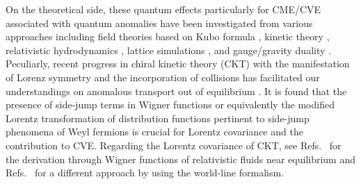 \documentclass[aps,prd,showkeys,preprint,amsmath,amssymb,nofootinbib]{revtex4-1}
\begin{document}
On the theoretical side, these quantum effects particularly for CME/CVE associated with quantum anomalies have been investigated from various approaches including field theories based on Kubo formula \cite{Fukushima:2008xe,Kharzeev:2009pj,Landsteiner:2011cp}, kinetic theory \cite{Gao:2012ix, Son:2012wh, Stephanov:2012ki, Son:2012zy,Chen:2012ca,Manuel:2013zaa,
Manuel:2014dza,Kharzeev:2016sut, Huang:2017tsq,Gao:2017gfq}, 
relativistic hydrodynamics \cite{Son:2009tf,Neiman:2010zi,Sadofyev:2010pr,Pu:2010as,Kharzeev:2011ds},
lattice simulations \cite{Abramczyk:2009gb,Buividovich:2009wi,Buividovich:2009zzb,Buividovich:2010tn,Yamamoto:2011gk,Mueller:2016ven,Mace:2016shq}, and
gauge/gravity duality \cite{Erdmenger2009,Torabian2009a,Banerjee2011,Landsteiner2011}. Peculiarly, recent progress in chiral kinetic theory (CKT) with the manifestation of Lorenz symmetry and the incorporation of collisions has facilitated our understandings on anomalous transport out of equilibrium \cite{Chen:2014cla,Chen:2015gta,Hidaka:2016yjf}. It is found that the presence of side-jump terms in Wigner functions or equivalently the modified Lorentz transformation of distribution functions pertinent to side-jump phenomena of Weyl fermions is crucial for Lorentz covariance and the contribution to CVE. Regarding the Lorentz covariance of CKT, see Refs.~\cite{Chen:2012ca,Gao:2017gfq} for the derivation through Wigner functions of relativistic fluids near equilibrium and Refs.~\cite{Mueller:2017arw,Mueller:2017lzw} for a different approach by using the world-line formalism.
\end{document}
